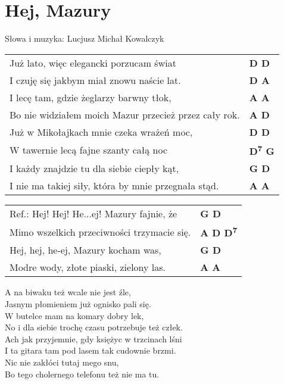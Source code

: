 \section{Hej, Mazury}

Słowa i muzyka: Lucjusz Michał Kowalczyk\\

\vspace{2em}
\begin{tabular}{@{}p{9cm}@{}l@{}}
Już lato, więc elegancki porzucam świat & \bfseries  D D \\
I czuję się jakbym miał znowu naście lat. & \bfseries  D A \\
I lecę tam, gdzie żeglarzy barwny tłok, & \bfseries  A A \\
Bo nie widziałem moich Mazur przecież przez cały rok. & \bfseries  A D \\
Już w Mikołajkach mnie czeka wrażeń moc, & \bfseries  D D \\
W tawernie lecą fajne szanty całą noc & \bfseries  D\textsuperscript{7} G \\
I każdy znajdzie tu dla siebie ciepły kąt, & \bfseries  G D \\
I nie ma takiej siły, która by mnie przegnała stąd. & \bfseries  A A \\
\end{tabular}

\vspace{1em}
\begin{tabular}{@{}p{9cm}@{}l@{}}
Ref.: Hej! Hej! He...ej! Mazury fajnie, że & \bfseries  G D \\
Mimo wszelkich przeciwności trzymacie się. & \bfseries A D D\textsuperscript{7} \\
Hej, hej, he-ej, Mazury kocham was, & \bfseries G D \\
Modre wody, złote piaski, zielony las. & \bfseries  A A \\
\end{tabular}

\vspace{1em}
A na biwaku też wcale nie jest źle, \\
Jasnym płomieniem już ognisko pali się. \\
W butelce mam na komary dobry lek, \\
No i dla siebie trochę czasu potrzebuje też człek. \\
Ach jak przyjemnie, gdy księżyc w trzcinach lśni \\
I ta gitara tam pod lasem tak cudownie brzmi. \\
Nic nie zakłóci tutaj mego snu, \\
Bo tego cholernego telefonu też nie ma tu. \\
\newpage

